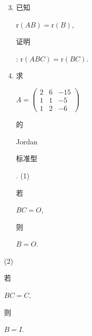 \documentclass[10pt]{article}
\begin{document}
\begin{enumerate}
  \setcounter{enumi}{2}
  \item \begin{CJK}{UTF8}{mj}已知\end{CJK} $\mathrm{r}(A B)=\mathrm{r}(B)$, \begin{CJK}{UTF8}{mj}证明\end{CJK}: $\mathrm{r}(A B C)=\mathrm{r}(B C)$.

  \item \begin{CJK}{UTF8}{mj}求\end{CJK} $A=\left(\begin{array}{ccc}2 & 6 & -15 \\ 1 & 1 & -5 \\ 1 & 2 & -6\end{array}\right)$ \begin{CJK}{UTF8}{mj}的\end{CJK} Jordan \begin{CJK}{UTF8}{mj}标准型\end{CJK}. (1) \begin{CJK}{UTF8}{mj}若\end{CJK} $B C=O$, \begin{CJK}{UTF8}{mj}则\end{CJK} $B=O$.

\end{enumerate}
(2) \begin{CJK}{UTF8}{mj}若\end{CJK} $B C=C$, \begin{CJK}{UTF8}{mj}则\end{CJK} $B=I$.
\end{document}

